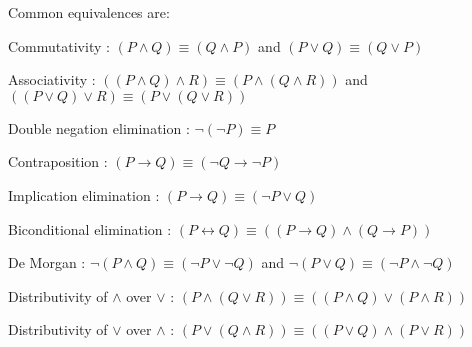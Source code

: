 \begin{description}
        Common equivalences are:
        \begin{descriptionlist}
            \item[Commutativity]: $(P \land Q) \equiv (Q \land P)$ and $(P \vee Q) \equiv (Q \vee P)$
            \item[Associativity]: $((P \land Q) \land R) \equiv (P \land (Q \land R))$
                and $((P \vee Q) \vee R) \equiv (P \vee (Q \vee R))$
            \item[Double negation elimination]: $\lnot(\lnot P) \equiv P$
            \item[Contraposition]: $(P \rightarrow Q) \equiv (\lnot Q \rightarrow \lnot P)$
            \item[Implication elimination]: $(P \rightarrow Q) \equiv (\lnot P \vee Q)$
            \item[Biconditional elimination]: $(P \leftrightarrow Q) \equiv ((P \rightarrow Q) \land (Q \rightarrow P))$
            \item[De Morgan]: $\lnot(P \land Q) \equiv (\lnot P \vee \lnot Q)$ and $\lnot(P \vee Q) \equiv (\lnot P \land \lnot Q)$
            \item[Distributivity of $\land$ over $\vee$]: $(P \land (Q \vee R)) \equiv ((P \land Q) \vee (P \land R))$
            \item[Distributivity of $\vee$ over $\land$]: $(P \vee (Q \land R)) \equiv ((P \vee Q) \land (P \vee R))$
        \end{descriptionlist}
\end{description}

